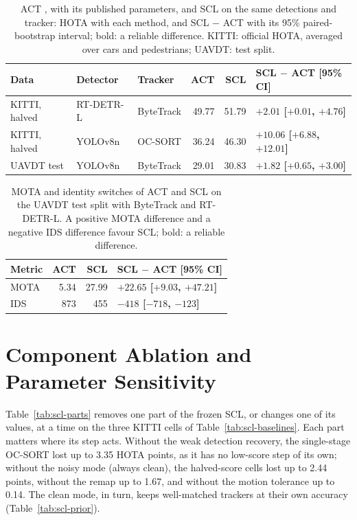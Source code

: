 \begin{table}[tbp]
\centering
\caption{ACT \cite{act2026adaptive}, with its published parameters, and SCL on the same detections and tracker: HOTA with each method, and SCL $-$ ACT with its 95\% paired-bootstrap interval; bold: a reliable difference. KITTI: official HOTA, averaged over cars and pedestrians; UAVDT: test split.}
\label{tab:scl-act}
\begin{tabular}{lllrrl}
\toprule
Data & Detector & Tracker & ACT & SCL & SCL $-$ ACT [95\% CI]\\
\midrule
KITTI, halved & RT-DETR-L & ByteTrack & 49.77 & 51.79 & \textbf{$+2.01$ [$+0.01$, $+4.76$]}\\
KITTI, halved & YOLOv8n & OC-SORT & 36.24 & 46.30 & \textbf{$+10.06$ [$+6.88$, $+12.01$]}\\
UAVDT test & YOLOv8n & ByteTrack & 29.01 & 30.83 & \textbf{$+1.82$ [$+0.65$, $+3.00$]}\\
\bottomrule
\end{tabular}
\end{table}

\begin{table}[tbp]
\centering
\caption{MOTA and identity switches of ACT and SCL on the UAVDT test split with ByteTrack and RT-DETR-L. A positive MOTA difference and a negative IDS difference favour SCL; bold: a reliable difference.}
\label{tab:scl-act-uavdt}
\begin{tabular}{lrrl}
\toprule
Metric & ACT & SCL & SCL $-$ ACT [95\% CI]\\
\midrule
MOTA & 5.34 & 27.99 & \textbf{$+22.65$ [$+9.03$, $+47.21$]}\\
IDS & 873 & 455 & \textbf{$-418$ [$-718$, $-123$]}\\
\bottomrule
\end{tabular}
\end{table}

\section{Component Ablation and Parameter Sensitivity}\label{sec:scl-ablation}
Table~\ref{tab:scl-parts} removes one part of the frozen SCL, or changes one of its values, at a time on the three KITTI cells of Table~\ref{tab:scl-baselines}. Each part matters where its step acts. Without the weak detection recovery, the single-stage OC-SORT lost up to 3.35 HOTA points, as it has no low-score step of its own; without the noisy mode (always clean), the halved-score cells lost up to 2.44 points, without the remap up to 1.67, and without the motion tolerance up to 0.14. The clean mode, in turn, keeps well-matched trackers at their own accuracy (Table~\ref{tab:scl-prior}).

